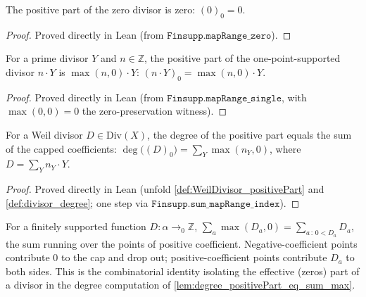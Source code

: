 \begin{lemma}

  \label{lem:positivePart_zero}
  The positive part of the zero divisor is zero: \((0)_0 = 0\).
\end{lemma}
\begin{proof}
  Proved directly in Lean (from \(\texttt{Finsupp.mapRange\_zero}\)).
\end{proof}
\begin{lemma}

  \label{lem:positivePart_single}
  For a prime divisor \(Y\) and \(n \in \mathbb Z\), the positive part of the
  one-point-supported divisor \(n \cdot Y\) is \(\max(n, 0) \cdot Y\):
  \((n \cdot Y)_0 = \max(n, 0) \cdot Y\).
\end{lemma}
\begin{proof}
  Proved directly in Lean (from \(\texttt{Finsupp.mapRange\_single}\), with
  \(\max(0, 0) = 0\) the zero-preservation witness).
\end{proof}
\begin{lemma}

  \label{lem:degree_positivePart_eq_sum_max}
  For a Weil divisor \(D \in \mathrm{Div}(X)\), the degree of the positive part
  equals the sum of the capped coefficients:
  \(\deg\bigl((D)_0\bigr) = \sum_Y \max(n_Y, 0)\), where \(D = \sum_Y n_Y \cdot Y\).
\end{lemma}
\begin{proof}
  Proved directly in Lean (unfold \ref{def:WeilDivisor_positivePart} and
  \ref{def:divisor_degree}; one step via \(\texttt{Finsupp.sum\_mapRange\_index}\)).
\end{proof}
\begin{lemma}
  \label{lem:finsupp_sum_max_zero_eq_sum_filter_pos}
  For a finitely supported function \(D \colon \alpha \to_0 \mathbb Z\),
  \(\sum_a \max(D_a, 0) = \sum_{a \,:\, 0 < D_a} D_a\), the sum running over
  the points of positive coefficient. Negative-coefficient points contribute
  \(0\) to the cap and drop out; positive-coefficient points contribute
  \(D_a\) to both sides. This is the combinatorial identity isolating the
  effective (zeros) part of a divisor in the degree computation of
  \ref{lem:degree_positivePart_eq_sum_max}.
\end{lemma}
